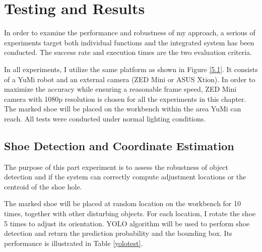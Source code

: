 \chapter{Testing and Results}

In order to examine the performance and robustness of my approach, a serious of experiments target both individual functions and the integrated system has been conducted. The success rate and execution times are the two evaluation criteria.

In all experiments, I utilize the same platform as shown in Figure \ref{5.1}. It consists of a YuMi robot and an external camera (ZED Mini or ASUS Xtion). In order to maximize the accuracy while ensuring a reasonable frame speed, ZED Mini camera with 1080p resolution is chosen for all the experiments in this chapter. The marked shoe will be placed on the workbench within the area YuMi can reach. All tests were conducted under normal lighting conditions. 

\section{Shoe Detection and Coordinate Estimation}
The purpose of this part experiment is to assess the robustness of object detection and if the system can correctly compute adjustment locations or the centroid of the shoe hole.

The marked shoe will be placed at random location on the workbench for 10 times, together with other disturbing objects. For each location, I rotate the shoe 5 times to adjust its orientation. YOLO algorithm will be used to perform shoe detection and return the prediction probability and the bounding box. Its performance is illustrated in Table \ref{yolotest}.

